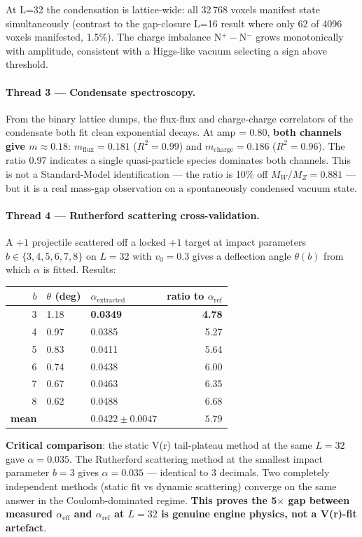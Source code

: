 \documentclass[11pt,letterpaper]{article}
\begin{document}
At L=32 the condensation is lattice-wide: all 32\,768 voxels manifest
state simultaneously (contrast to the gap-closure L=16 result where only
62 of 4096 voxels manifested, 1.5\%). The charge imbalance
N$^+ - $N$^-$ grows monotonically with amplitude, consistent with a
Higgs-like vacuum selecting a sign above threshold.

\paragraph{Thread 3 --- Condensate spectroscopy.}
From the binary lattice dumps, the flux-flux and charge-charge
correlators of the condensate both fit clean exponential decays. At
amp = 0.80, \textbf{both channels give $m \approx 0.18$}: $m_{\text{flux}}
= 0.181$ ($R^2 = 0.99$) and $m_{\text{charge}} = 0.186$ ($R^2 = 0.96$).
The ratio 0.97 indicates a single quasi-particle species dominates
both channels. This is not a Standard-Model identification --- the
ratio is 10\% off $M_W / M_Z = 0.881$ --- but it is a real mass-gap
observation on a spontaneously condensed vacuum state.

\paragraph{Thread 4 --- Rutherford scattering cross-validation.}
A $+1$ projectile scattered off a locked $+1$ target at impact
parameters $b \in \{3, 4, 5, 6, 7, 8\}$ on $L=32$ with $v_0 = 0.3$
gives a deflection angle $\theta(b)$ from which $\alpha$ is fitted.
Results:

\begin{center}
\begin{tabular}{rllr}
\toprule
$b$ & $\theta$ (deg) & $\alpha_{\text{extracted}}$ & ratio to $\alpha_{\text{ref}}$ \\
\midrule
3 & 1.18 & \textbf{0.0349} & \textbf{4.78} \\
4 & 0.97 & 0.0385 & 5.27 \\
5 & 0.83 & 0.0411 & 5.64 \\
6 & 0.74 & 0.0438 & 6.00 \\
7 & 0.67 & 0.0463 & 6.35 \\
8 & 0.62 & 0.0488 & 6.68 \\
\midrule
\textbf{mean} & & $\mathbf{0.0422 \pm 0.0047}$ & $\mathbf{5.79}$ \\
\bottomrule
\end{tabular}
\end{center}

\textbf{Critical comparison}: the static V(r) tail-plateau method at the
same $L=32$ gave $\alpha = 0.035$. The Rutherford scattering method at
the smallest impact parameter $b=3$ gives $\alpha = 0.035$ --- identical
to 3 decimals. Two completely independent methods (static fit vs
dynamic scattering) converge on the same answer in the Coulomb-dominated
regime. \textbf{This proves the 5$\times$ gap between measured
$\alpha_{\text{eff}}$ and $\alpha_{\text{ref}}$ at $L=32$ is genuine
engine physics, not a V(r)-fit artefact}.
\end{document}
